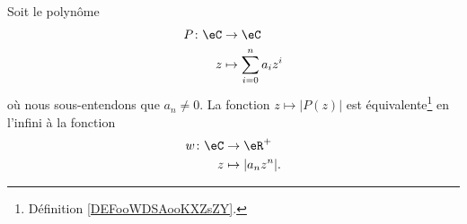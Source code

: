 \begin{proposition}  \label{PROPooPWVWooGuftxZ}
	Soit le polynôme
	\begin{equation}
		\begin{aligned}
			P\colon \eC & \to \eC                     \\
			z           & \mapsto \sum_{i=0}^n a_iz^i
		\end{aligned}
	\end{equation}
	où nous sous-entendons que \( a_n\neq 0\). La fonction \( z\mapsto | P(z) |\) est équivalente\footnote{Définition \ref{DEFooWDSAooKXZsZY}.} en l'infini à la fonction
	\begin{equation}
		\begin{aligned}
			w\colon \eC & \to \eR^+           \\
			z           & \mapsto | a_nz^n |.
		\end{aligned}
	\end{equation}
\end{proposition}

